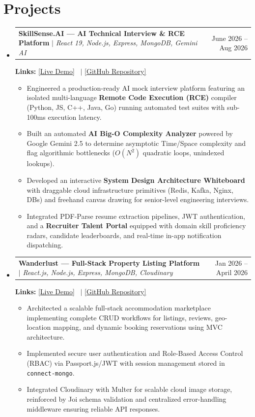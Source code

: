 \documentclass[letterpaper,10.8pt]{article}
\makeatletter
\newcommand{\resumeItem}[1]{
  \item\small{
    {#1 \vspace{-2pt}}
  }
}
\newcommand{\resumeProjectHeading}[2]{
    \vspace{-2pt}\item
    \begin{tabular*}{0.98\textwidth}{l@{\extracolsep{\fill}}r}
      #1 & #2 \\
    \end{tabular*}\vspace{-6pt}
}
\newcommand{\resumeSubHeadingListStart}{\begin{itemize}[leftmargin=0.15in, label={}]}
\newcommand{\resumeSubHeadingListEnd}{\end{itemize}}
\newcommand{\resumeItemListStart}{\begin{itemize}[leftmargin=0.15in]}
\newcommand{\resumeItemListEnd}{\end{itemize}\vspace{-4pt}}
\makeatother
\begin{document}
\section{Projects}
  \resumeSubHeadingListStart
    \resumeProjectHeading
      {\textbf{SkillSense.AI — AI Technical Interview \& RCE Platform} $|$ \emph{React 19, Node.js, Express, MongoDB, Gemini AI}}{June 2026 -- Aug 2026}
      \small{\textbf{Links:} \href{https://mern-skill-sense-ai-interview-platf.vercel.app}{\underline{[Live Demo]}} \ $|$ \href{https://github.com/shubham6401/SkillSense-AI-Interview-Platform}{\underline{[GitHub Repository]}}}
      \resumeItemListStart
        \resumeItem{Engineered a production-ready AI mock interview platform featuring an isolated multi-language \textbf{Remote Code Execution (RCE)} compiler (Python, JS, C++, Java, Go) running automated test suites with sub-100ms execution latency.}
        \resumeItem{Built an automated \textbf{AI Big-O Complexity Analyzer} powered by Google Gemini 2.5 to determine asymptotic Time/Space complexity and flag algorithmic bottlenecks ($O(N^2)$ quadratic loops, unindexed lookups).}
        \resumeItem{Developed an interactive \textbf{System Design Architecture Whiteboard} with draggable cloud infrastructure primitives (Redis, Kafka, Nginx, DBs) and freehand canvas drawing for senior-level engineering interviews.}
        \resumeItem{Integrated PDF-Parse resume extraction pipelines, JWT authentication, and a \textbf{Recruiter Talent Portal} equipped with domain skill proficiency radars, candidate leaderboards, and real-time in-app notification dispatching.}
      \resumeItemListEnd

    \resumeProjectHeading
      {\textbf{Wanderlust — Full-Stack Property Listing Platform} $|$ \emph{React.js, Node.js, Express, MongoDB, Cloudinary}}{Jan 2026 -- April 2026}
      \small{\textbf{Links:} \href{https://wanderlust-demo.onrender.com}{\underline{[Live Demo]}} \ $|$ \href{https://github.com/shubham6401}{\underline{[GitHub Repository]}}}
      \resumeItemListStart
        \resumeItem{Architected a scalable full-stack accommodation marketplace implementing complete CRUD workflows for listings, reviews, geo-location mapping, and dynamic booking reservations using MVC architecture.}
        \resumeItem{Implemented secure user authentication and Role-Based Access Control (RBAC) via Passport.js/JWT with session management stored in \texttt{connect-mongo}.}
        \resumeItem{Integrated Cloudinary with Multer for scalable cloud image storage, reinforced by Joi schema validation and centralized error-handling middleware ensuring reliable API responses.}
      \resumeItemListEnd
  \resumeSubHeadingListEnd
\vspace{-6pt}
\end{document}
